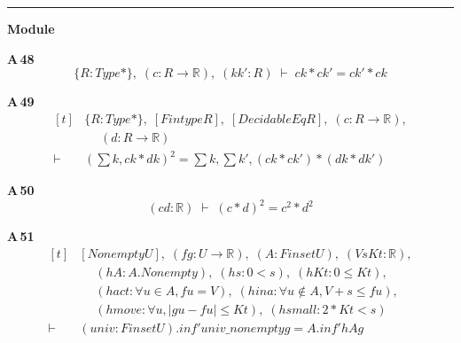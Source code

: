 \vspace{4pt}\noindent\rule{\columnwidth}{0.4pt}\par\vspace{2pt}
\noindent\textbf{Module }\par\vspace{3pt}

\noindent\textbf{A\,48}\quad{}
{\footnotesize\[ \{ \mathit{R} : \mathit{Type}*\},\; (\mathit{c} : \mathit{R} \to \mathbb{R} ),\; (\mathit{k} \mathit{k'} : \mathit{R}) \;\vdash\; \mathit{c} \mathit{k} * \mathit{c} \mathit{k'} = \mathit{c} \mathit{k'} * \mathit{c} \mathit{k} \]}

\noindent\textbf{A\,49}\quad{}
{\footnotesize\[ \begin{aligned}[t]
&\{ \mathit{R} : \mathit{Type}*\},\; [\mathit{Fintype} \mathit{R}],\; [\mathit{DecidableEq} \mathit{R}],\; (\mathit{c} : \mathit{R} \to \mathbb{R} ),\\
&\quad \; (\mathit{d} : \mathit{R} \to \mathbb{R} )\\
\vdash\;&(\textstyle\sum \mathit{k}, \mathit{c} \mathit{k} * \mathit{d} \mathit{k}) ^{2} = \textstyle\sum \mathit{k}, \textstyle\sum \mathit{k'}, (\mathit{c} \mathit{k} * \mathit{c} \mathit{k'}) * (\mathit{d} \mathit{k} * \mathit{d} \mathit{k'})
\end{aligned} \]}

\noindent\textbf{A\,50}\quad{}
{\footnotesize\[ (\mathit{c} \mathit{d} : \mathbb{R} ) \;\vdash\; (\mathit{c} * \mathit{d}) ^{2} = \mathit{c} ^{2} * \mathit{d} ^{2} \]}

\noindent\textbf{A\,51}\quad{}
{\footnotesize\[ \begin{aligned}[t]
&[\mathit{Nonempty} \mathit{U}],\; (\mathit{f} \mathit{g} : \mathit{U} \to \mathbb{R} ),\; (\mathit{A} : \mathit{Finset} \mathit{U}),\; (\mathit{V} \mathit{s} \mathit{Kt} : \mathbb{R} ),\\
&\quad \; (\mathit{hA} : \mathit{A}.\mathit{Nonempty}),\; (\mathit{hs} : 0 < \mathit{s}),\; (\mathit{hKt} : 0 \leq \mathit{Kt}),\\
&\quad \; (\mathit{hact} : \forall \mathit{u} \in \mathit{A}, \mathit{f} \mathit{u} = \mathit{V}),\; (\mathit{hina} : \forall \mathit{u} \notin \mathit{A}, \mathit{V} + \mathit{s} \leq \mathit{f} \mathit{u}),\\
&\quad \; (\mathit{hmove} : \forall \mathit{u}, |\mathit{g} \mathit{u} - \mathit{f} \mathit{u}| \leq \mathit{Kt}),\; (\mathit{hsmall} : 2 * \mathit{Kt} < \mathit{s})\\
\vdash\;&(\mathit{univ} : \mathit{Finset} \mathit{U}).\mathit{inf'} \mathit{univ\_nonempty} \mathit{g} = \mathit{A}.\mathit{inf'} \mathit{hA} \mathit{g}
\end{aligned} \]}


